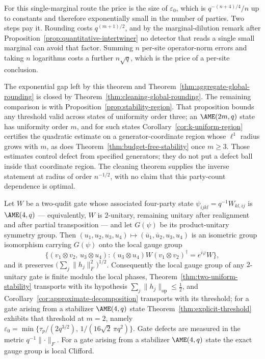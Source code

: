 For this single-marginal route the price is the size of \(\varepsilon_0\), which is
\(q^{-(n+4)/4}/n\) up to constants and therefore exponentially small in the
number of parties.  Two steps pay it.  Rounding costs \(q^{(m+1)/2}\), and
by the marginal-dilution remark after
Proposition~\ref{prop:quantitative-intertwiner} no detector that reads a
single small marginal can avoid that factor.  Summing \(n\) per-site
operator-norm errors and taking \(n\) logarithms costs a further
\(n\sqrt q\), which is the price of a per-site conclusion.

The exponential gap left by this theorem and
Theorem~\ref{thm:aggregate-global-rounding} is closed by
Theorem~\ref{thm:cleaning-global-rounding}.  The remaining comparison is
with Proposition~\ref{prop:stability-region}.  That proposition bounds
any threshold valid across states of uniformity order three; an
\(\AME(2m,q)\) state has uniformity order \(m\), and for such states
Corollary~\ref{cor:k-uniform-region} certifies the quadratic estimate on a
generator-coordinate region whose \(\ell^1\) radius grows with \(m\), as
does Theorem~\ref{thm:budget-free-stability} once \(m\geq3\).  Those
estimates control defect from specified generators; they do not put a
defect ball inside that coordinate region.  The cleaning theorem supplies
the inverse statement at radius of order \(n^{-1/2}\), with no claim that
this party-count dependence is optimal.

\begin{corollary}
\label{cor:two-unitary-gauge}
Let \(W\) be a two-qudit gate whose associated four-party state
\(\psi_{ijkl}=q^{-1}W_{kl,ij}\) is \(\AME(4,q)\) --- equivalently, \(W\) is
\(2\)-unitary, remaining unitary after realignment and after partial
transposition --- and let \(G(\psi)\) be its product-unitary symmetry
group.  Then
\((u_1,u_2,u_3,u_4)\mapsto(\overline u_1,\overline u_2,u_3,u_4)\) is an
isometric group isomorphism carrying \(G(\psi)\) onto the local gauge
group
\[
 \{(v_1\otimes v_2,\,u_3\otimes u_4):
   (u_3\otimes u_4)W(v_1\otimes v_2)^\dagger=e^{i\varphi}W\},
\]
and it preserves \(\bigl(\sum_j\lVert h_j\rVert_F^2\bigr)^{1/2}\).
Consequently the local gauge group of any \(2\)-unitary gate is finite
modulo the local phases, Theorem~\ref{thm:two-uniform-stability} transports
with its hypothesis \(\sum_j\lVert h_j\rVert_{\mathrm{op}}\leq\frac12\),
and Corollary~\ref{cor:approximate-decomposition} transports with its
threshold; for a gate arising from a stabilizer \(\AME(4,q)\) state
Theorem~\ref{thm:explicit-threshold} exhibits that threshold at \(m=2\),
namely \(\varepsilon_0=\min\{\tau_p/(2q^{3/2}),\,
1/(16\sqrt2\,\pi q^2)\}\).  Gate defects
are measured in the metric \(q^{-1}\lVert\cdot\rVert_F\).  For a gate
arising from a stabilizer \(\AME(4,q)\) state the exact gauge group is
local Clifford.
\end{corollary}

